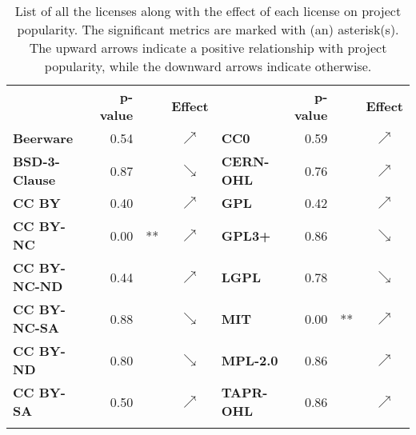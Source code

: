 \begin{table}[t]
	\scriptsize
	\centering
	\caption{List of all the licenses along with the effect of each license on project popularity. The significant metrics are marked with (an) asterisk(s). The upward arrows indicate a positive relationship with project popularity, while the downward arrows indicate otherwise.}
	\setlength{\tabcolsep}{2pt}
	\label{table:license}
	\begin{tabularx}{0.8\columnwidth}{>{\bfseries}lrlc||>{\bfseries}lrlc}
		\toprule
		\multirow{2}{*}{License}      & \multirow{2}{*}{\textbf{p-value}}  &    & \multirow{2}{*}{\textbf{Effect}}     & \multirow{2}{*}{License}  & \multirow{2}{*}{\textbf{p-value}}  &    & \multirow{2}{*}{\textbf{Effect}}     \\
		&&&&&&&\\ \midrule\midrule
		Beerware     & 0.54 &    & $\nearrow$ & CC0      & 0.59 &    & $\nearrow$ \\
		BSD-3-Clause & 0.87 &    & $\searrow$ & CERN-OHL & 0.76 &    & $\nearrow$ \\
		CC BY        & 0.40 &    & $\nearrow$ & GPL      & 0.42 &    & $\nearrow$ \\
		CC BY-NC     & 0.00 & ** & $\nearrow$ & GPL3+    & 0.86 &    & $\searrow$ \\
		CC BY-NC-ND  & 0.44 &    & $\nearrow$ & LGPL     & 0.78 &    & $\searrow$ \\
		CC BY-NC-SA  & 0.88 &    & $\searrow$ & MIT      & 0.00 & ** & $\nearrow$ \\
		CC BY-ND     & 0.80 &    & $\searrow$ & MPL-2.0  & 0.86 &    & $\nearrow$ \\
		CC BY-SA     & 0.50   &    & $\nearrow$ &TAPR-OHL          &  0.86        &    & $\nearrow$          \\ \bottomrule
		\multicolumn{8}{l}{$p-value$ codes:  `***'$<0$, `**'$<0.001$, `*'$<0.01$, `.'$<0.05$}\\ 
	\end{tabularx}
\vspace{-0.1cm}
\end{table}
